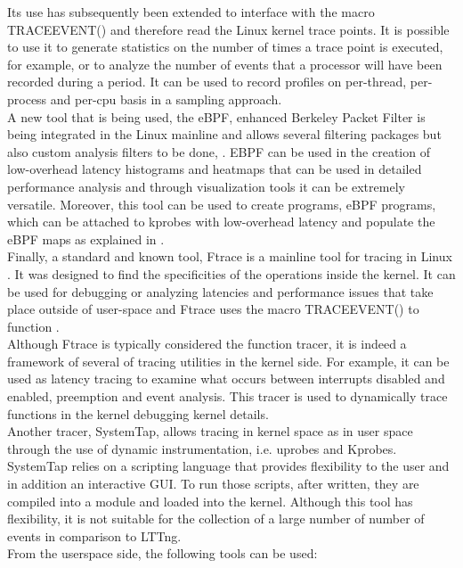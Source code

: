 Its use has subsequently been extended to interface with the macro TRACE\textunderscore EVENT() and therefore read the Linux kernel trace points. It is possible to use it to generate statistics on the number of times a trace point is executed, for example, or to analyze the number of events that a processor will have been recorded during a period. It can be used to record profiles on per-thread, per-process and per-cpu basis in a sampling approach.\\
A new tool that is being used, the eBPF, enhanced Berkeley Packet Filter \cite{ebpf} is being integrated in the Linux mainline and allows several filtering packages but also custom analysis filters to be done, \cite{brendan_ebpf}. EBPF can be used in the creation of low-overhead latency histograms and heatmaps that can be used in detailed performance analysis and through visualization tools it can be extremely versatile. Moreover, this tool can be used to create programs, eBPF programs, which can be attached to kprobes with low-overhead latency and populate the eBPF maps as explained in \cite{ebpf_maps}. \\
Finally, a standard and known tool, Ftrace is a mainline tool for tracing in Linux . It was designed to find the specificities of the operations inside the kernel. It can be used for debugging or analyzing latencies and performance issues that take place outside of user-space and Ftrace uses the macro TRACE\textunderscore EVENT() to function \cite{ftrace_red}.\\
Although Ftrace is typically considered the function tracer, it is indeed a framework of several of tracing utilities in the kernel side. For example, it can be used as latency tracing to examine what occurs between interrupts disabled and enabled, preemption and event analysis. This tracer is used to dynamically trace functions in the kernel debugging kernel details. \\
Another tracer, SystemTap, allows tracing in kernel space as in user space through the use of dynamic instrumentation, i.e. uprobes and Kprobes. SystemTap relies on  a scripting language that provides flexibility to the user and in addition an interactive GUI. To run those scripts, after written, they are compiled into a module and loaded into the kernel. Although this tool has flexibility, it is not suitable for the collection of a large number of number of events in comparison to LTTng.\\
From the userspace side, the following tools can be used:\\
